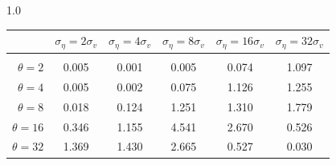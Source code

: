 \documentclass[12pt]{article}
\begin{document}
\begin{table}[h!]
\vspace{10pt}
\begin{subtable}{1.0\textwidth}
    \centering
\begin{tabular}{rccccc}
\hline  
            & \multicolumn{1}{l}{$\sigma_{\eta} =2\sigma_{v}$} & \multicolumn{1}{l}{$\sigma_{\eta} =4\sigma_{v}$} & \multicolumn{1}{l}{$\sigma_{\eta} =8\sigma_{v}$} & \multicolumn{1}{l}{$\sigma_{\eta} =16\sigma_{v}$} & \multicolumn{1}{l}{$\sigma_{\eta} =32\sigma_{v}$} \\ \hline  \vspace{-3mm} \\        
$\theta=2$  & 0.005                                             & 0.001                                             & 0.005                                             & 0.074                                              & 1.097                                              \\ \hline
$\theta=4$  & 0.005                                             & 0.002                                             & 0.075                                             & 1.126                                              & 1.255                                              \\ \hline
$\theta=8$  & 0.018                                             & 0.124                                             & 1.251                                             & 1.310                                              & 1.779                                              \\ \hline
$\theta=16$ & 0.346                                             & 1.155                                             & 4.541                                             & 2.670                                              & 0.526                                              \\ \hline
$\theta=32$ & 1.369                                             & 1.430                                             & 2.665                                             & 0.527                                              & 0.030                                              \\ \hline
\end{tabular}
\end{subtable}


\end{table}
\end{document}

